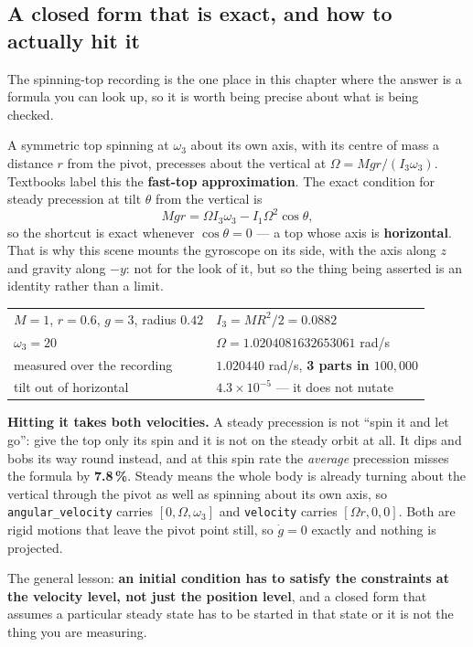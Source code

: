 \documentclass[11pt]{article}
\newcommand{\code}[1]{\texttt{#1}}
\begin{document}
\subsection{A closed form that is exact, and how to actually hit it}

The spinning-top recording is the one place in this chapter where the
answer is a formula you can look up, so it is worth being precise about
what is being checked.

A symmetric top spinning at $\omega_3$ about its own axis, with its
centre of mass a distance $r$ from the pivot, precesses about the
vertical at $\Omega = M g r / (I_3 \omega_3)$. Textbooks label this the
\textbf{fast-top approximation}. The exact condition for steady
precession at tilt $\theta$ from the vertical is
\[
  M g r = \Omega I_3 \omega_3 - I_1 \Omega^2 \cos\theta,
\]
so the shortcut is exact whenever $\cos\theta = 0$ --- a top whose axis
is \textbf{horizontal}. That is why this scene mounts the gyroscope on
its side, with the axis along $z$ and gravity along $-y$: not for the
look of it, but so the thing being asserted is an identity rather than
a limit.

\begin{center}
\begin{tabular}{p{7.0cm}p{7.0cm}}
$M = 1$, $r = 0.6$, $g = 3$, radius $0.42$ & $I_3 = MR^2/2 = 0.0882$\\
$\omega_3 = 20$ & $\Omega = 1.0204081632653061$ rad/s\\
measured over the recording & $1.020440$ rad/s, \textbf{3 parts in
$100{,}000$}\\
tilt out of horizontal & $4.3\times10^{-5}$ --- it does not nutate\\
\end{tabular}
\end{center}

\textbf{Hitting it takes both velocities.} A steady precession is not
``spin it and let go'': give the top only its spin and it is not on the
steady orbit at all. It dips and bobs its way round instead, and at
this spin rate the \emph{average} precession misses the formula by
\textbf{7.8\,\%}. Steady means the whole body is already turning about
the vertical through the pivot as well as spinning about its own axis,
so \code{angular\_velocity} carries $[0, \Omega, \omega_3]$ and
\code{velocity} carries $[\Omega r, 0, 0]$. Both are rigid motions that
leave the pivot point still, so $\dot g = 0$ exactly and nothing is
projected.

The general lesson: \textbf{an initial condition has to satisfy the
constraints at the velocity level, not just the position level}, and a
closed form that assumes a particular steady state has to be started in
that state or it is not the thing you are measuring.
\end{document}
